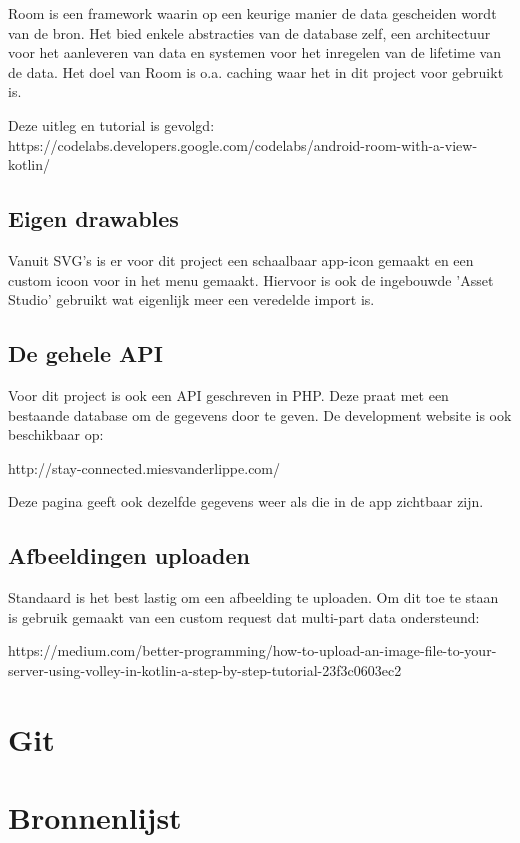 \documentclass[dutch]{report}
\begin{document}
	Room is een framework waarin op een keurige manier de data gescheiden wordt van de bron. Het bied enkele 
	abstracties van de database zelf, een architectuur voor het aanleveren van data en systemen voor het 
	inregelen van de lifetime van de data. Het doel van Room is o.a. caching waar het in dit project voor gebruikt 
	is. 
	
	\vspace{1em}
	Deze uitleg en tutorial is gevolgd: https://codelabs.developers.google.com/codelabs/android-room-with-a-view-kotlin/
	
	\subsection{Eigen drawables}
	Vanuit SVG's is er voor dit project een schaalbaar app-icon gemaakt en een custom icoon voor in het menu gemaakt.
	Hiervoor is ook de ingebouwde 'Asset Studio' gebruikt wat eigenlijk meer een veredelde import is.
	
	\subsection{De gehele API}
	Voor dit project is ook een API geschreven in PHP. Deze praat met een bestaande database om de gegevens door te geven. 
	De development website is ook beschikbaar op: 
	
	http://stay-connected.miesvanderlippe.com/
	
	Deze pagina geeft ook dezelfde gegevens weer als die in de app zichtbaar zijn. 
	
	\subsection{Afbeeldingen uploaden}
	Standaard is het best lastig om een afbeelding te uploaden. Om dit toe te staan is gebruik gemaakt van een custom 
	request dat multi-part data ondersteund: 
	
	https://medium.com/better-programming/how-to-upload-an-image-file-to-your-server-using-volley-in-kotlin-a-step-by-step-tutorial-23f3c0603ec2
	
	
	\section{Git}
	
	\section{Bronnenlijst}
	
\end{document}
